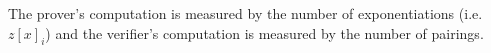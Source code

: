 \begin{table}[h]
\begin{center}
\begin{minipage}{\textwidth}
{%
The prover's computation is measured by the number of exponentiations (i.e. $z[x]_i$) and the verifier's computation is measured by the number of pairings.\label{table:eff}  } 
\end{minipage}
\vspace{-0.54cm}

\end{center}
\end{table}
